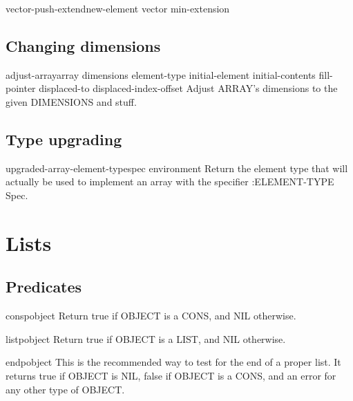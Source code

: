 \documentclass[10pt,english]{book}
\begin{document}
\begin{function}{vector-push-extend}{new-element vector \op min-extension}
  
\end{function}

\section{Changing dimensions}
\label{sec:changing-dimensions}

\begin{function}{adjust-array}{array dimensions \key element-type initial-element initial-contents
 fill-pointer displaced-to displaced-index-offset}
  Adjust ARRAY's dimensions to the given DIMENSIONS and stuff.
\end{function}

\section{Type upgrading}
\label{sec:type-upgrading}

\begin{function}{upgraded-array-element-type}{spec \op environment}
  Return the element type that will actually be used to implement an array
   with the specifier :ELEMENT-TYPE Spec.
\end{function}


\chapter{Lists}
\label{cha:lists}

\section{Predicates}
\label{sec:list-predicates}

\begin{function}{consp}{object}
  Return true if OBJECT is a CONS, and NIL otherwise.
\end{function}

\begin{function}{listp}{object}
  Return true if OBJECT is a LIST, and NIL otherwise.
\end{function}

\begin{function}{endp}{object}
  This is the recommended way to test for the end of a proper list. It
  returns true if OBJECT is NIL, false if OBJECT is a CONS, and an error
  for any other type of OBJECT.
\end{function}
\end{document}
